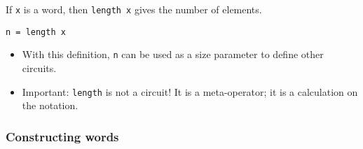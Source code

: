 \documentclass[11pt]{article}
\begin{document}
If \texttt{x} is a word, then \texttt{length x} gives the number of
elements.

\begin{verbatim}
n = length x
\end{verbatim}

\begin{itemize}
\item With this definition, \texttt{n} can be used as a size
parameter to define other circuits.
\item Important: \texttt{length} is not a circuit!  It is a
meta-operator; it is a calculation on the notation.
\end{itemize}

\subsubsection{Constructing words}
\label{sec:org366c1c1}
\end{document}
